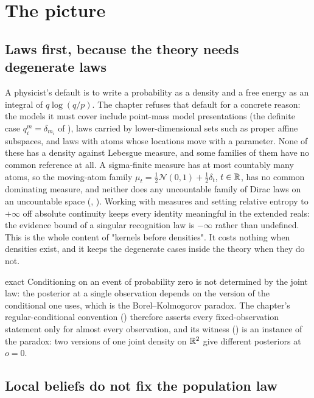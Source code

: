 \section{The picture}
\label{comp:ch03-picture}

\subsection{Laws first, because the theory needs degenerate laws}

A physicist's default is to write a probability as a density and a free energy as an integral of
$q\log(q/p)$. The chapter refuses that default for a concrete reason: the models it must cover include
point-mass model presentations (the definite case $q_i^m=\delta_{m_i}$ of ),
laws carried by lower-dimensional sets such as proper affine subspaces, and laws with atoms whose locations
move with a parameter. None of these has a density against Lebesgue measure, and some families of them have
no common reference at all. A sigma-finite measure has at most countably many atoms, so the moving-atom family
$\mu_t=\tfrac12\mathcal N(0,1)+\tfrac12\delta_t$, $t\in\mathbb R$, has no common dominating measure, and neither does
any uncountable family of Dirac laws on an uncountable space (,
). Working with measures and setting relative entropy to $+\infty$ off
absolute continuity keeps every identity meaningful in the extended reals: the evidence bound of a singular
recognition law is $-\infty$ rather than undefined. This is the whole content of "kernels before densities".
It costs nothing when densities exist, and it keeps the degenerate cases inside the theory when they do not.

\begin{analogy}{exact}
Conditioning on an event of probability zero is not determined by the joint law: the posterior at a single
observation depends on the version of the conditional one uses, which is the Borel--Kolmogorov paradox. The
chapter's regular-conditional convention () therefore asserts
every fixed-observation statement only for almost every observation, and its witness
() is an instance of the paradox: two versions of one joint density on $\mathbb R^2$ give
different posteriors at $o=0$.
\end{analogy}

\subsection{Local beliefs do not fix the population law}

